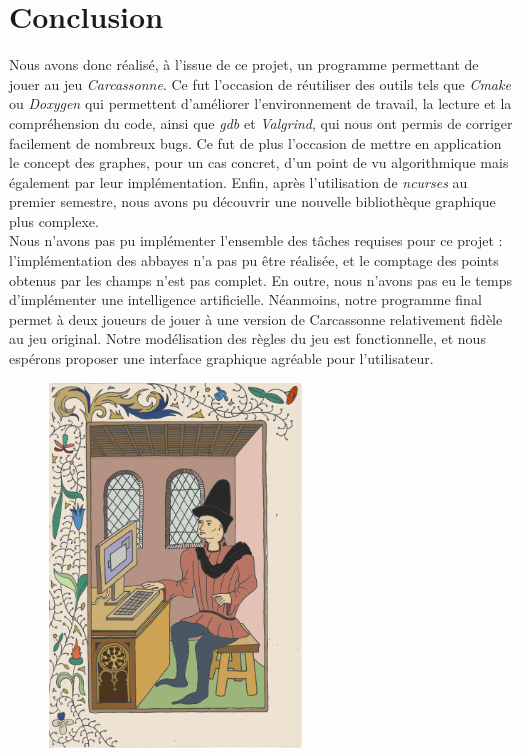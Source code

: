 \documentclass[a4paper, 11pt]{article}
\begin{document}
\newpage
\section*{Conclusion}
\indent Nous avons donc réalisé, à l'issue de ce projet, un programme permettant de jouer au jeu \emph{Carcassonne}. Ce fut l'occasion de réutiliser des outils tels que \emph{Cmake} ou \emph{Doxygen} qui permettent d'améliorer l'environnement de travail, la lecture et la compréhension du code, ainsi que \emph{gdb} et \emph{Valgrind}, qui nous ont permis de corriger facilement de nombreux bugs. Ce fut de plus l'occasion de mettre en application le concept des graphes, pour un cas concret, d'un point de vu algorithmique mais également par leur implémentation. Enfin, après l'utilisation de \textit{ncurses} au premier semestre, nous avons pu découvrir une nouvelle bibliothèque graphique plus complexe.\\
\indent Nous n'avons pas pu implémenter l'ensemble des tâches requises pour ce projet : l'implémentation des abbayes n'a pas pu être réalisée, et le comptage des points obtenus par les champs n'est pas complet. En outre, nous n'avons pas eu le temps d'implémenter une intelligence artificielle. Néanmoins, notre programme final permet à deux joueurs de jouer à une version de Carcassonne relativement fidèle au jeu original. Notre modélisation des règles du jeu est fonctionnelle, et nous espérons proposer une interface graphique agréable pour l'utilisateur.

\begin{figure}[H]
\centering
\includegraphics[width = 0.6\textwidth]{img/Enluminure_v_resized.png}
\end{figure}
\end{document}
